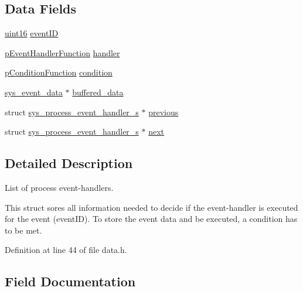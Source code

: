 \subsection*{Data Fields}
\begin{DoxyCompactItemize}
\item 
\hyperlink{definitions_8h_a05f6b0ae8f6a6e135b0e290c25fe0e4e}{uint16} \hyperlink{structsys__process__event__handler__s_a4b799aaf40561daed132a1a1d688ecd8}{event\+I\+D}
\item 
\hyperlink{events_8h_a38c799788eea576b2d878371da3d5385}{p\+Event\+Handler\+Function} \hyperlink{structsys__process__event__handler__s_a980eeb4cb54ac72cd3ebc38e391c40a5}{handler}
\item 
\hyperlink{events_8h_a653a4a4b7d9f5a65e1415365267a9d9e}{p\+Condition\+Function} \hyperlink{structsys__process__event__handler__s_a43ea89783cb8b5cfd0896410f1f7a691}{condition}
\item 
\hyperlink{events_8h_ae3a76ca1b349999a35d55f3224897b5f}{sys\+\_\+event\+\_\+data} $\ast$ \hyperlink{structsys__process__event__handler__s_adbcb330724f201fb328fb91d2c6353e3}{buffered\+\_\+data}
\item 
struct \hyperlink{structsys__process__event__handler__s}{sys\+\_\+process\+\_\+event\+\_\+handler\+\_\+s} $\ast$ \hyperlink{structsys__process__event__handler__s_abbb4742265dace5feffc2a1b05d5271c}{previous}
\item 
struct \hyperlink{structsys__process__event__handler__s}{sys\+\_\+process\+\_\+event\+\_\+handler\+\_\+s} $\ast$ \hyperlink{structsys__process__event__handler__s_abd718f866343f0a1e139c977bbae72b8}{next}
\end{DoxyCompactItemize}


\subsection{Detailed Description}
List of process event-\/handlers. 

This struct sores all information needed to decide if the event-\/handler is executed for the event (event\+I\+D). To store the event data and be executed, a condition has to be met. 

Definition at line 44 of file data.\+h.



\subsection{Field Documentation}
\hypertarget{structsys__process__event__handler__s_adbcb330724f201fb328fb91d2c6353e3}{}
